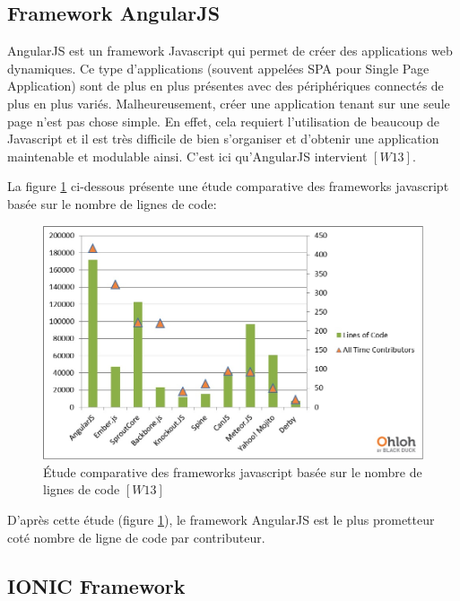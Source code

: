 \subsection{Framework AngularJS}

AngularJS est un framework Javascript qui permet de créer des applications web dynamiques. Ce type d'applications (souvent appelées SPA pour Single Page Application) sont de plus en plus présentes avec des périphériques connectés de plus en plus variés. Malheureusement, créer une application tenant sur une seule page n'est pas chose simple. En effet, cela requiert l’utilisation de beaucoup de Javascript et il est très difficile de bien s’organiser et d'obtenir une application maintenable et modulable ainsi. C’est ici qu’AngularJS intervient $[W13]$.

\vspace{6pt}
\paragraphmark

La figure \ref{a1} ci-dessous présente une étude comparative des frameworks javascript basée sur le nombre de lignes de code:

\begin{figure}[!ht]
\begin{center}
\includegraphics[scale=0.6]{a1.jpg}
\caption{\'Etude comparative des frameworks javascript basée sur le nombre de lignes de code $[W13]$}
\label{a1}
\end{center}
\end{figure}

D'après cette étude (figure \ref{a1}), le framework AngularJS est le plus prometteur coté nombre de ligne de code par contributeur.

\subsection{IONIC Framework}

